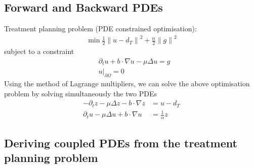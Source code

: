 \documentclass{article}  %
\begin{document}









\subsection{Forward and Backward PDEs}

Treatment planning problem (PDE constrained optimisation):
%
\begin{align} 
    \min \frac{1}{2} {\lVert u - d_T \rVert}^2 + \frac{\alpha}{2} {\lVert g \rVert}^2
\end{align}
%
subject to a constraint
%
\begin{align} 
    &\partial_t u + b \cdot \nabla u - \mu \Delta u = g\\
    &{u \rvert}_{\partial \Omega} = 0
\end{align}
%
Using the method of Lagrange multipliers, we can solve the above optimisation problem by solving simultaneously the two PDEs
%
\begin{align}
    - \partial_t z - \mu \Delta z - b \cdot \nabla z &= u - d_T\\
    \partial_t u - \mu \Delta u + b \cdot \nabla u &= \frac{1}{\alpha} z 
\end{align}
%

\subsection{Deriving coupled PDEs from the treatment planning problem}
\end{document}
